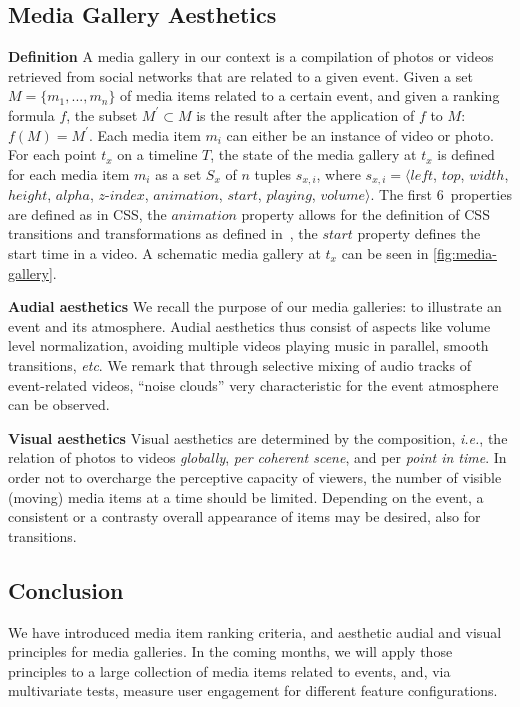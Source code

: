 
\subsection{Media Gallery Aesthetics}

\noindent \textbf{Definition}
A media gallery in our context is a compilation of photos or videos
retrieved from social networks that are related to a given event.
Given a set $M = \{m_1,..., m_n\}$ of media items related to a certain event,
and given a ranking formula $f$,
the subset $M^\prime \subset M$
is the result after the application of $f$ to $M$: $f(M)=M^\prime$.
Each media item $m_i$ can either be an instance of video or photo.
For each point $t_x$ on a timeline $T$, the state of the media gallery
at $t_x$ is defined for each media item $m_i$
as a set $S_x$ of $n$ tuples $s_{x,i}$, where
$s_{x,i}=\langle \mathit{left}$, $\mathit{top}$, $\mathit{width}$, $\mathit{height}$,
$\mathit{alpha}$, $\mathit{z\mbox{-}index}$, $\mathit{animation}$,
$\mathit{start}$, $\mathit{playing}$, $\mathit{volume} \rangle$.
The first 6~properties are defined as in CSS, the $\mathit{animation}$ property
allows for the definition of CSS transitions
and transformations as defined in~\cite{CSSTransitions2009,CSSTransforms2012},
the $\mathit{start}$ property defines the start time in a video.
A schematic media gallery at $t_x$ can be seen in \autoref{fig:media-gallery}.

\noindent \textbf{Audial aesthetics}
We recall the purpose of our media galleries:
to illustrate an event and its atmosphere.
Audial aesthetics thus consist of aspects like volume level normalization,
avoiding multiple videos playing music in parallel, smooth transitions, \emph{etc}.
We remark that through selective mixing of audio tracks
of event-related videos, ``noise clouds'' very characteristic
for the event atmosphere can be observed.

\noindent \textbf{Visual aesthetics}
Visual aesthetics are determined by the composition, \emph{i.e.},
the relation of photos to videos \emph{globally}, \emph{per coherent scene},
and per \emph{point in time}.
In order not to overcharge the perceptive capacity
of viewers, the number of visible (moving) media items
at a time should be limited.
Depending on the event, a consistent or a contrasty overall
appearance of items may be desired, also for transitions.

\subsection{Conclusion}
We have introduced media item ranking criteria, and
aesthetic audial and visual principles for media galleries.
In the coming months, we will apply those principles
to a large collection of media items related to events,
and, via multivariate tests, measure user engagement
for different feature configurations.

